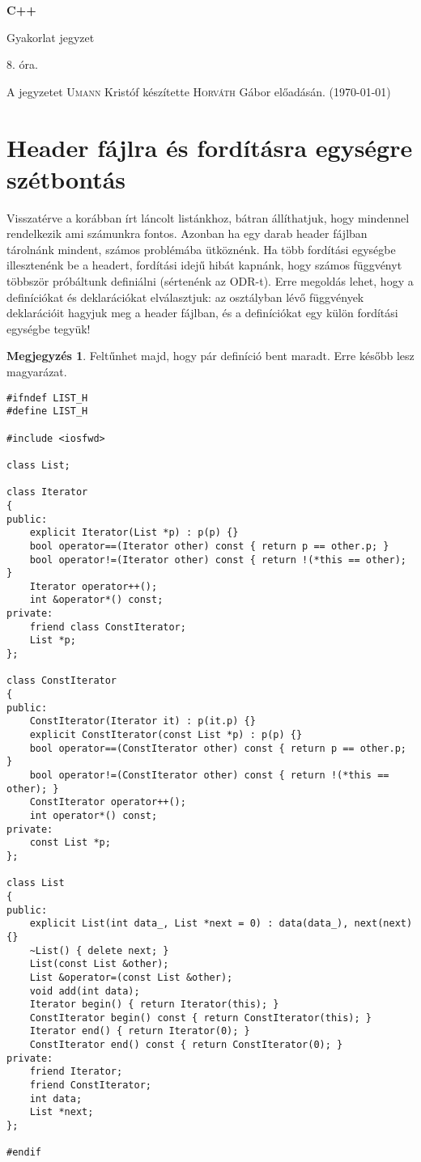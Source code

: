 \documentclass[a4paper,11.5pt,table]{article}
\begin{document}
	\setlength\parindent{0pt}
	\def\<{<\hspace{0mm}<}
	
	\theoremstyle{definition}
	\newtheorem{note}{Megjegyzés}[subsection]
	
	\begin{center}
		{\LARGE\textbf{C++}}
		
		{\Large Gyakorlat jegyzet}
		
		8. óra.
	\end{center}
	A jegyzetet \textsc{Umann} Kristóf készítette \textsc{Horváth} Gábor  előadásán. (\today)
	\section{Header fájlra és fordításra egységre szétbontás}
	Visszatérve a korábban írt láncolt listánkhoz, bátran állíthatjuk, hogy mindennel rendelkezik ami számunkra fontos. Azonban ha egy darab header fájlban tárolnánk mindent, számos problémába ütköznénk. Ha több fordítási egységbe illesztenénk be a headert, fordítási idejű hibát kapnánk, hogy számos függvényt többször próbáltunk definiálni (sértenénk az ODR-t). Erre megoldás lehet, hogy a definíciókat és deklarációkat elválasztjuk: az osztályban lévő függvények deklarációit hagyjuk meg a header fájlban, és a definíciókat egy külön fordítási egységbe tegyük!
	
	\begin{note}
		Feltűnhet majd, hogy pár definíció bent maradt. Erre később lesz magyarázat.
	\end{note}
	
	\medskip
\begin{lstlisting}
#ifndef LIST_H
#define LIST_H

#include <iosfwd>

class List;

class Iterator 
{
public:
	explicit Iterator(List *p) : p(p) {}
	bool operator==(Iterator other) const { return p == other.p; }
	bool operator!=(Iterator other) const { return !(*this == other); }
	Iterator operator++();
	int &operator*() const;
private:
	friend class ConstIterator;
	List *p;
};

class ConstIterator
{
public:
	ConstIterator(Iterator it) : p(it.p) {}
	explicit ConstIterator(const List *p) : p(p) {}
	bool operator==(ConstIterator other) const { return p == other.p; }
	bool operator!=(ConstIterator other) const { return !(*this == other); }
	ConstIterator operator++();
	int operator*() const;
private:
	const List *p;
};

class List 
{
public:
	explicit List(int data_, List *next = 0) : data(data_), next(next) {}
	~List() { delete next; }
	List(const List &other);
	List &operator=(const List &other);
	void add(int data);
	Iterator begin() { return Iterator(this); }
	ConstIterator begin() const { return ConstIterator(this); }
	Iterator end() { return Iterator(0); }
	ConstIterator end() const { return ConstIterator(0); }
private:
	friend Iterator;
	friend ConstIterator;
	int data;
	List *next;
};

#endif
\end{lstlisting}
\end{document}
